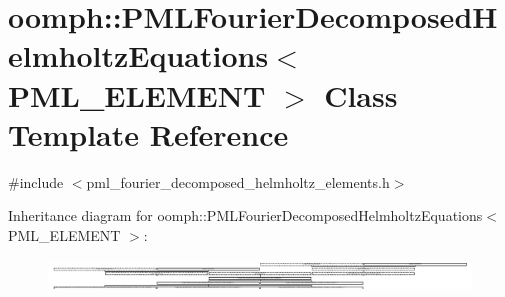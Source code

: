 \hypertarget{classoomph_1_1PMLFourierDecomposedHelmholtzEquations}{}\section{oomph\+:\+:P\+M\+L\+Fourier\+Decomposed\+Helmholtz\+Equations$<$ P\+M\+L\+\_\+\+E\+L\+E\+M\+E\+NT $>$ Class Template Reference}
\label{classoomph_1_1PMLFourierDecomposedHelmholtzEquations}


{\ttfamily \#include $<$pml\+\_\+fourier\+\_\+decomposed\+\_\+helmholtz\+\_\+elements.\+h$>$}

Inheritance diagram for oomph\+:\+:P\+M\+L\+Fourier\+Decomposed\+Helmholtz\+Equations$<$ P\+M\+L\+\_\+\+E\+L\+E\+M\+E\+NT $>$\+:\begin{figure}[H]
\begin{center}
\leavevmode
\includegraphics[height=0.871369cm]{classoomph_1_1PMLFourierDecomposedHelmholtzEquations}
\end{center}
\end{figure}
